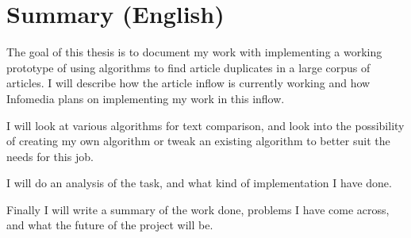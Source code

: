 \chapter{Summary (English)}

The goal of this thesis is to document my work with implementing a working prototype of using algorithms to find article duplicates in a large corpus of articles. I will describe how the article inflow is currently working and how Infomedia plans on implementing my work in this inflow.

I will look at various algorithms for text comparison, and look into the possibility of creating my own algorithm or tweak an existing algorithm to better suit the needs for this job.

I will do an analysis of the task, and what kind of implementation I have done.

Finally I will write a summary of the work done, problems I have come across, and what the future of the project will be.